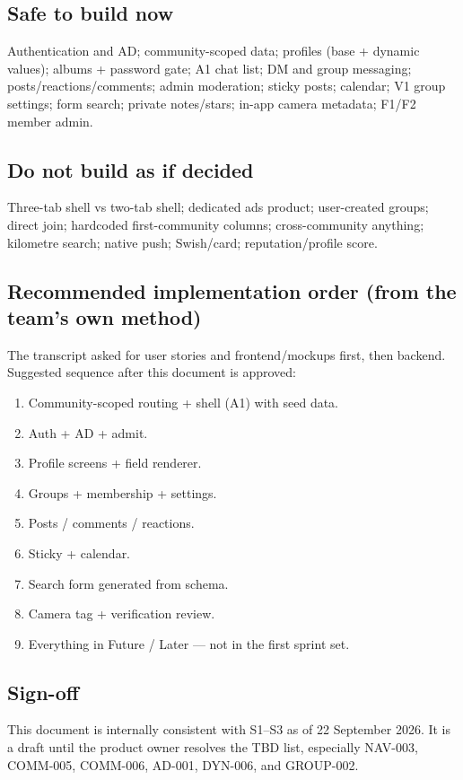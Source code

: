 \documentclass[11pt,a4paper]{article}
\begin{document}
\subsection{Safe to build now}
Authentication and AD; community-scoped data; profiles (base + dynamic values); albums + password gate; A1 chat list; DM and group messaging; posts/reactions/comments; admin moderation; sticky posts; calendar; V1 group settings; form search; private notes/stars; in-app camera metadata; F1/F2 member admin.

\subsection{Do not build as if decided}
Three-tab shell vs two-tab shell; dedicated ads product; user-created groups; direct join; hardcoded first-community columns; cross-community anything; kilometre search; native push; Swish/card; reputation/profile score.

\subsection{Recommended implementation order (from the team's own method)}
The transcript asked for user stories and frontend/mockups first, then backend. Suggested sequence after this document is approved:
\begin{enumerate}
  \item Community-scoped routing + shell (A1) with seed data.
  \item Auth + AD + admit.
  \item Profile screens + field renderer.
  \item Groups + membership + settings.
  \item Posts / comments / reactions.
  \item Sticky + calendar.
  \item Search form generated from schema.
  \item Camera tag + verification review.
  \item Everything in Future / Later --- not in the first sprint set.
\end{enumerate}

\subsection{Sign-off}
This document is internally consistent with S1--S3 as of 22 September 2026. It is a draft until the product owner resolves the TBD list, especially NAV-003, COMM-005, COMM-006, AD-001, DYN-006, and GROUP-002.
\end{document}
